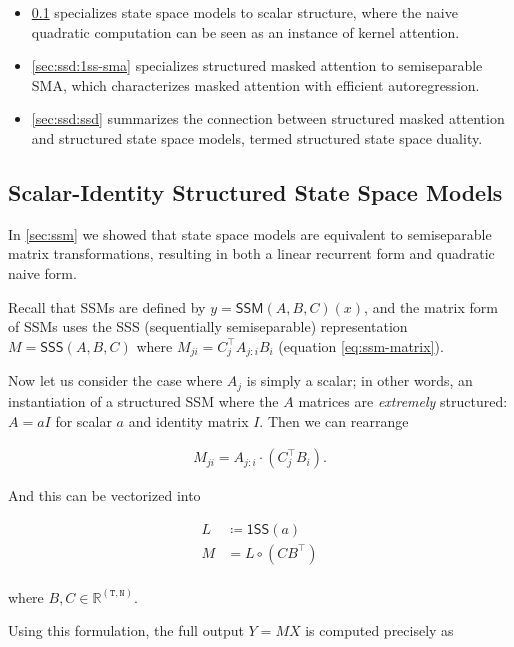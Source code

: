 \begin{itemize}
  \item \ref{sec:ssd:quadratic-ssm} specializes state space models to scalar structure, where the naive quadratic computation can be seen as an instance of kernel attention.
  \item \ref{sec:ssd:1ss-sma} specializes structured masked attention to semiseparable SMA, which characterizes masked attention with efficient autoregression.
  \item \ref{sec:ssd:ssd} summarizes the connection between structured masked attention and structured state space models, termed structured state space duality.
\end{itemize}

\subsection{Scalar-Identity Structured State Space Models}
\label{sec:ssd:quadratic-ssm}

In \ref{sec:ssm} we showed that state space models are equivalent to semiseparable matrix transformations, resulting in both a linear recurrent form and quadratic naive form.

Recall that SSMs are defined by $y = \mathsf{SSM}(A, B, C)(x)$, and the matrix form of SSMs uses the SSS (sequentially semiseparable) representation $M = \mathsf{SSS}(A, B, C)$ where $M_{ji} = C_j^{\top} A_{j:i} B_i$ (equation \eqref{eq:ssm-matrix}).

Now let us consider the case where $A_j$ is simply a scalar; in other words, an instantiation of a structured SSM where the $A$ matrices are \emph{extremely} structured: $A = aI$ for scalar $a$ and identity matrix $I$. Then we can rearrange

\begin{align*}
  M_{ji} = A_{j:i} \cdot (C_j^{\top}B_i)
.
\end{align*}

And this can be vectorized into

\begin{align*}
  L &\coloneqq \mathsf{1SS}(a) \\
  M &= L \circ (C B^{\top}) \\
\end{align*}

where $B, C \in \mathbb{R}^{\mathtt{(T,N)}}$.

Using this formulation, the full output $Y=MX$ is computed precisely as

